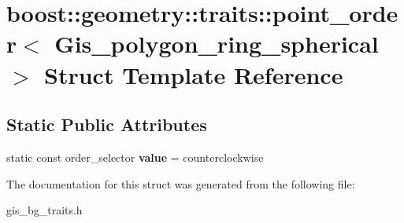 \hypertarget{structboost_1_1geometry_1_1traits_1_1point__order_3_01Gis__polygon__ring__spherical_01_4}{}\section{boost\+:\+:geometry\+:\+:traits\+:\+:point\+\_\+order$<$ Gis\+\_\+polygon\+\_\+ring\+\_\+spherical $>$ Struct Template Reference}
\label{structboost_1_1geometry_1_1traits_1_1point__order_3_01Gis__polygon__ring__spherical_01_4}
\subsection*{Static Public Attributes}
\begin{DoxyCompactItemize}
\item 
\mbox{\label{structboost_1_1geometry_1_1traits_1_1point__order_3_01Gis__polygon__ring__spherical_01_4_a504e41c870aeaf7066474f08786c897b}} 
static const order\+\_\+selector {\bfseries value} = counterclockwise
\end{DoxyCompactItemize}


The documentation for this struct was generated from the following file\+:\begin{DoxyCompactItemize}
\item 
gis\+\_\+bg\+\_\+traits.\+h\end{DoxyCompactItemize}
